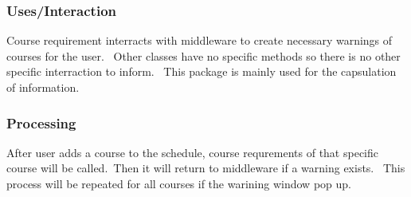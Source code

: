 \documentclass[twoside,letterpaper]{article}
\begin{document}
\subsubsection{Uses/Interaction}
Course requirement interracts with middleware to create necessary warnings of courses for the user. \ Other classes have no specific methods so there is no other specific interraction to inform. \ This package is mainly used for the capsulation of information.
\subsubsection{Processing}
After user adds a course to the schedule, course requrements of that specific course will be called.\ Then it will return to middleware if a warning exists. \ This process will be repeated for all courses if the warining window pop up.
\end{document}

